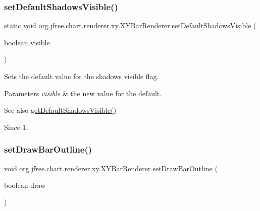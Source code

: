 \subsubsection{\texorpdfstring{set\+Default\+Shadows\+Visible()}{setDefaultShadowsVisible()}}
{\footnotesize\ttfamily static void org.\+jfree.\+chart.\+renderer.\+xy.\+X\+Y\+Bar\+Renderer.\+set\+Default\+Shadows\+Visible (\begin{DoxyParamCaption}\item[{boolean}]{visible }\end{DoxyParamCaption})\hspace{0.3cm}{\ttfamily [static]}}

Sets the default value for the shadows visible flag.


\begin{DoxyParams}{Parameters}
{\em visible} & the new value for the default.\\
\hline
\end{DoxyParams}
\begin{DoxySeeAlso}{See also}
\mbox{\hyperlink{classorg_1_1jfree_1_1chart_1_1renderer_1_1xy_1_1_x_y_bar_renderer_adc7256cc011739e14552e7abf8f454d0}{get\+Default\+Shadows\+Visible()}}
\end{DoxySeeAlso}
\begin{DoxySince}{Since}
1.. 
\end{DoxySince}
\mbox{\label{classorg_1_1jfree_1_1chart_1_1renderer_1_1xy_1_1_x_y_bar_renderer_ad3a163a0e30056d5dbbadd3376f80345}} 
\subsubsection{\texorpdfstring{set\+Draw\+Bar\+Outline()}{setDrawBarOutline()}}
{\footnotesize\ttfamily void org.\+jfree.\+chart.\+renderer.\+xy.\+X\+Y\+Bar\+Renderer.\+set\+Draw\+Bar\+Outline (\begin{DoxyParamCaption}\item[{boolean}]{draw }\end{DoxyParamCaption})}

